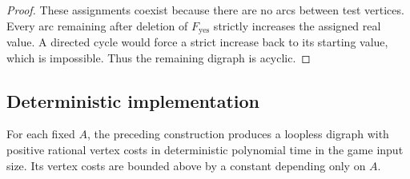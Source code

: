 \begin{proof}
These assignments coexist because there are no arcs between test vertices.
Every arc remaining after deletion of $F_{\mathrm{yes}}$ strictly
increases the assigned real value.  A directed cycle would force a strict
increase back to its starting value, which is impossible.  Thus the
remaining digraph is acyclic.
\end{proof}

\subsection{Deterministic implementation}

\begin{proposition}
\label{prop:polynomial}
For each fixed $A$, the preceding construction produces a loopless digraph
with positive rational vertex costs in deterministic polynomial time in the
game input size.  Its vertex costs are bounded above by a constant depending
only on $A$.
\end{proposition}

